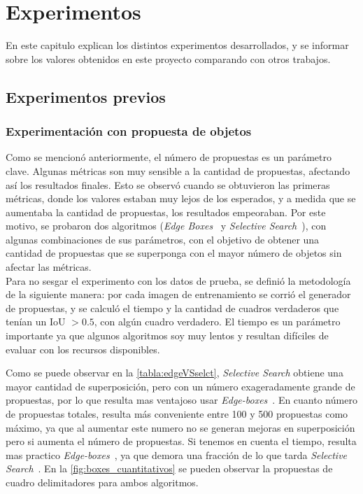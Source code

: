 \chapter{Experimentos}\label{cap:experimentos}

En este capitulo explican los distintos experimentos desarrollados, y se informar sobre los valores obtenidos en este proyecto comparando con otros trabajos. 


\section{Experimentos previos}

\subsection{Experimentación con propuesta de objetos} \label{ssec:experimentacionconpropuestadeobjetos}
Como se mencionó anteriormente, el número de propuestas es un parámetro clave. Algunas métricas son muy sensible a la cantidad de propuestas, afectando así los resultados finales. Esto se observó cuando se obtuvieron las primeras métricas, donde los valores estaban muy lejos de los esperados, y a medida que se aumentaba la cantidad de propuestas, los resultados empeoraban. Por este motivo, se probaron dos algoritmos (\textit{Edge Boxes}~\cite{zitnick2014edge} y \textit{Selective Search}~\cite{uijlings2013selective}), con algunas combinaciones de sus parámetros, con el objetivo de obtener una cantidad de propuestas que se superponga con el mayor número de objetos sin afectar las métricas.\\

Para no sesgar el experimento con los datos de prueba, se definió la metodología de la siguiente manera: por cada imagen de entrenamiento se corrió el generador de propuestas, y se calculó el tiempo y la cantidad de cuadros verdaderos que tenían un IoU $> 0.5$, con algún cuadro verdadero. El tiempo es un parámetro importante ya que algunos algoritmos soy muy lentos y resultan difíciles de evaluar con los recursos disponibles. 

Como se puede observar en la \autoref{tabla:edgeVSselct}, \textit{Selective Search} obtiene una mayor cantidad de superposición, pero con un número exageradamente grande de propuestas, por lo que resulta mas ventajoso usar \textit{Edge-boxes}~\cite{zitnick2014edge}. En cuanto número de propuestas totales, resulta más conveniente entre 100 y 500 propuestas como máximo, ya que al aumentar este numero no se generan mejoras en superposición pero si aumenta el número de propuestas. Si tenemos en cuenta el tiempo, resulta mas practico \textit{Edge-boxes}~\cite{zitnick2014edge}, ya que demora una fracción de lo que tarda \textit{Selective Search}~\cite{uijlings2013selective}. En la \autoref{fig:boxes_cuantitativos} se pueden observar la propuestas de cuadro delimitadores para ambos algoritmos.

